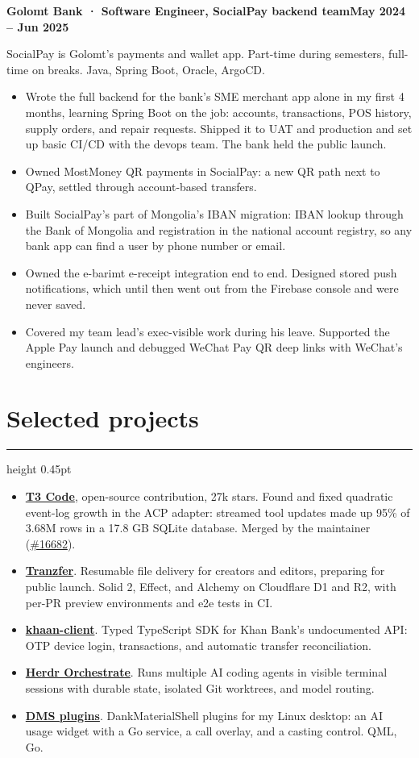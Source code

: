 \documentclass[9.5pt,letterpaper]{article}
\newcommand{\cvsection}[1]{\section*{#1}\vspace{3pt}\hrule height 0.45pt\vspace{3pt}}
\newcommand{\dated}[2]{#1\hfill#2\par}
\begin{document}
\dated{\textbf{Golomt Bank · Software Engineer, SocialPay backend team}}{\textbf{May 2024 – Jun 2025}}
SocialPay is Golomt's payments and wallet app. Part-time during semesters, full-time on breaks. Java, Spring Boot, Oracle, ArgoCD.
\begin{itemize}
  \item Wrote the full backend for the bank's SME merchant app alone in my first 4 months, learning Spring Boot on the job: accounts, transactions, POS history, supply orders, and repair requests. Shipped it to UAT and production and set up basic CI/CD with the devops team. The bank held the public launch.
  \item Owned MostMoney QR payments in SocialPay: a new QR path next to QPay, settled through account-based transfers.
  \item Built SocialPay's part of Mongolia's IBAN migration: IBAN lookup through the Bank of Mongolia and registration in the national account registry, so any bank app can find a user by phone number or email.
  \item Owned the e-barimt e-receipt integration end to end. Designed stored push notifications, which until then went out from the Firebase console and were never saved.
  \item Covered my team lead's exec-visible work during his leave. Supported the Apple Pay launch and debugged WeChat Pay QR deep links with WeChat's engineers.
\end{itemize}
\cvsection{Selected projects}
\begin{itemize}
  \item \href{https://github.com/pingdotgg/t3code}{\textcolor{linkblue}{\textbf{T3 Code}}}, open-source contribution, 27k stars. Found and fixed quadratic event-log growth in the ACP adapter: streamed tool updates made up 95\% of 3.68M rows in a 17.8 GB SQLite database. Merged by the maintainer (\href{https://github.com/pingdotgg/t3code/pull/16682}{\textcolor{linkblue}{\#16682}}).
  \item \href{https://github.com/darjss/tranzfer-v2}{\textcolor{linkblue}{\textbf{Tranzfer}}}. Resumable file delivery for creators and editors, preparing for public launch. Solid 2, Effect, and Alchemy on Cloudflare D1 and R2, with per-PR preview environments and e2e tests in CI.
  \item \href{https://github.com/darjss/khaan-client}{\textcolor{linkblue}{\textbf{khaan-client}}}. Typed TypeScript SDK for Khan Bank's undocumented API: OTP device login, transactions, and automatic transfer reconciliation.
  \item \href{https://github.com/darjss/herdr-orchestrate}{\textcolor{linkblue}{\textbf{Herdr Orchestrate}}}. Runs multiple AI coding agents in visible terminal sessions with durable state, isolated Git worktrees, and model routing.
  \item \href{https://github.com/darjss/dms-bar-usage}{\textcolor{linkblue}{\textbf{DMS plugins}}}. DankMaterialShell plugins for my Linux desktop: an AI usage widget with a Go service, a call overlay, and a casting control. QML, Go.
\end{itemize}
\end{document}
